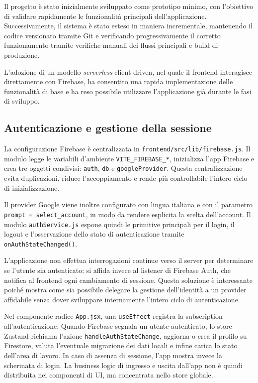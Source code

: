 \documentclass[11pt,a4paper]{article}
\begin{document}
\par Il progetto è stato inizialmente sviluppato come prototipo minimo, con l’obiettivo di validare rapidamente le funzionalità principali dell’applicazione. Successivamente, il sistema è stato esteso in maniera incrementale, mantenendo il codice versionato tramite Git e verificando progressivamente il corretto funzionamento tramite verifiche manuali dei flussi principali e build di produzione.
\par L’adozione di un modello \emph{serverless} client-driven, nel quale il frontend interagisce direttamente con Firebase, ha consentito una rapida implementazione delle funzionalità di base e ha reso possibile utilizzare l’applicazione già durante le fasi di sviluppo.

\subsection{Autenticazione e gestione della sessione}
\par La configurazione Firebase è centralizzata in \texttt{frontend/src/lib/firebase.js}. Il modulo legge le variabili d'ambiente \texttt{VITE\_FIREBASE\_*}, inizializza l'app Firebase e crea tre oggetti condivisi: \texttt{auth}, \texttt{db} e \texttt{googleProvider}. Questa centralizzazione evita duplicazioni, riduce l'accoppiamento e rende più controllabile l'intero ciclo di inizializzazione.

\par Il provider Google viene inoltre configurato con lingua italiana e con il parametro \texttt{prompt = select\_account}, in modo da rendere esplicita la scelta dell'account. Il modulo \texttt{authService.js} espone quindi le primitive principali per il login, il logout e l'osservazione dello stato di autenticazione tramite \texttt{onAuthStateChanged()}.

\par L'applicazione non effettua interrogazioni continue verso il server per determinare se l'utente sia autenticato: si affida invece al listener di Firebase Auth, che notifica al frontend ogni cambiamento di sessione. Questa soluzione è interessante poiché mostra come sia possibile delegare la gestione dell'identità a un provider affidabile senza dover sviluppare internamente l'intero ciclo di autenticazione.

\par Nel componente radice \texttt{App.jsx}, una \texttt{useEffect} registra la subscription all'autenticazione. Quando Firebase segnala un utente autenticato, lo store Zustand richiama l'azione \texttt{handleAuthStateChange}, aggiorna o crea il profilo su Firestore, valuta l'eventuale migrazione dei dati locali e infine carica lo stato dell'area di lavoro. In caso di assenza di sessione, l'app mostra invece la schermata di login. La business logic di ingresso e uscita dall'app non è quindi distribuita nei componenti di UI, ma concentrata nello store globale.
\end{document}
